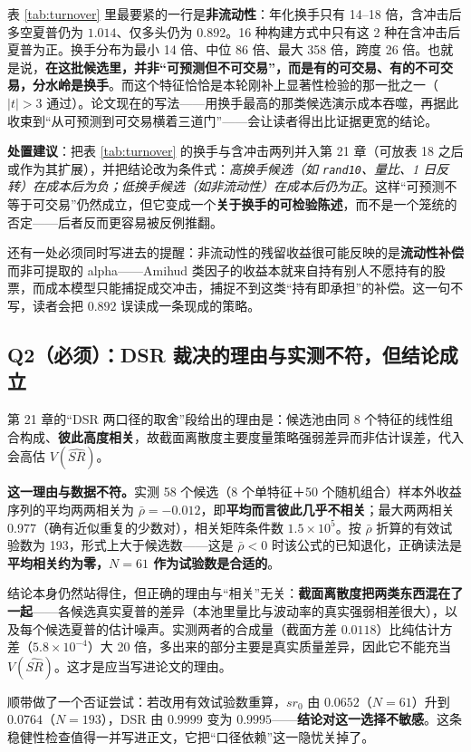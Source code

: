 \documentclass[11pt,a4paper]{ctexart}
\begin{document}
表 \ref{tab:turnover} 里最要紧的一行是\textbf{非流动性}：年化换手只有 14--18 倍，含冲击后多空夏普仍为 $1.014$、仅多头仍为 $0.892$。16 种构建方式中只有这 2 种在含冲击后夏普为正。换手分布为最小 14 倍、中位 86 倍、最大 358 倍，跨度 26 倍。也就是说，\textbf{在这批候选里，并非“可预测但不可交易”，而是有的可交易、有的不可交易，分水岭是换手}。而这个特征恰恰是本轮刚补上显著性检验的那一批之一（$|t|>3$ 通过）。论文现在的写法——用换手最高的那类候选演示成本吞噬，再据此收束到“从可预测到可交易横着三道门”——会让读者得出比证据更宽的结论。

\textbf{处置建议}：把表 \ref{tab:turnover} 的换手与含冲击两列并入第 21 章（可放表 18 之后或作为其扩展），并把结论改为条件式：\emph{高换手候选（如 \texttt{rand10}、量比、1 日反转）在成本后为负；低换手候选（如非流动性）在成本后仍为正}。这样“可预测不等于可交易”仍然成立，但它变成一个\textbf{关于换手的可检验陈述}，而不是一个笼统的否定——后者反而更容易被反例推翻。

还有一处必须同时写进去的提醒：非流动性的残留收益很可能反映的是\textbf{流动性补偿}而非可提取的 alpha——Amihud 类因子的收益本就来自持有别人不愿持有的股票，而成本模型只能捕捉成交冲击，捕捉不到这类“持有即承担”的补偿。这一句不写，读者会把 $0.892$ 误读成一条现成的策略。

\subsection{Q2（必须）：DSR 裁决的理由与实测不符，但结论成立}

第 21 章的“DSR 两口径的取舍”段给出的理由是：候选池由同 8 个特征的线性组合构成、\textbf{彼此高度相关}，故截面离散度主要度量策略强弱差异而非估计误差，代入会高估 $V(\widehat{SR})$。

\textbf{这一理由与数据不符。}实测 58 个候选（8 个单特征＋50 个随机组合）样本外收益序列的平均两两相关为 $\bar\rho=-0.012$，即\textbf{平均而言彼此几乎不相关}；最大两两相关 0.977（确有近似重复的少数对），相关矩阵条件数 $1.5\times10^5$。按 $\bar\rho$ 折算的有效试验数为 193，形式上大于候选数——这是 $\bar\rho<0$ 时该公式的已知退化，正确读法是\textbf{平均相关约为零，$N=61$ 作为试验数是合适的}。

结论本身仍然站得住，但正确的理由与“相关”无关：\textbf{截面离散度把两类东西混在了一起}——各候选真实夏普的差异（本池里量比与波动率的真实强弱相差很大），以及每个候选夏普的估计噪声。实测两者的合成量（截面方差 $0.0118$）比纯估计方差（$5.8\times10^{-4}$）大 20 倍，多出来的部分主要是真实质量差异，因此它不能充当 $V(\widehat{SR})$。这才是应当写进论文的理由。

顺带做了一个否证尝试：若改用有效试验数重算，$sr_0$ 由 $0.0652$（$N=61$）升到 $0.0764$（$N=193$），DSR 由 $0.9999$ 变为 $0.9995$——\textbf{结论对这一选择不敏感}。这条稳健性检查值得一并写进正文，它把“口径依赖”这一隐忧关掉了。
\end{document}
